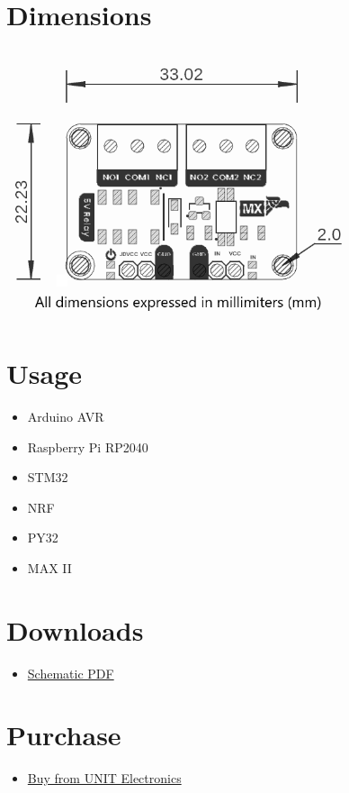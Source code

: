 \documentclass[10pt]{article}
\begin{document}
\section*{Dimensions}
\vspace{1em}
\begin{center}
\includegraphics[width=0.75\textwidth,keepaspectratio]{../../hardware/resources/unit_dimension_v_0_0_1ue0082_modulo_rele_g6k_.png}
\end{center}



\section*{Usage}
\begin{itemize}
\item Arduino AVR
\item Raspberry Pi RP2040
\item STM32
\item NRF
\item PY32
\item MAX II
\end{itemize}

\section*{Downloads}

\begin{itemize}
\item \href{unit_sch_v_0_0_1ue0082_modulo_rele_g6k_.pdf}{Schematic PDF}
\end{itemize}


\section*{Purchase}
\begin{itemize}
\item \href{https://www.uelectronics.com}{Buy from UNIT Electronics}
\end{itemize}
\end{document}
